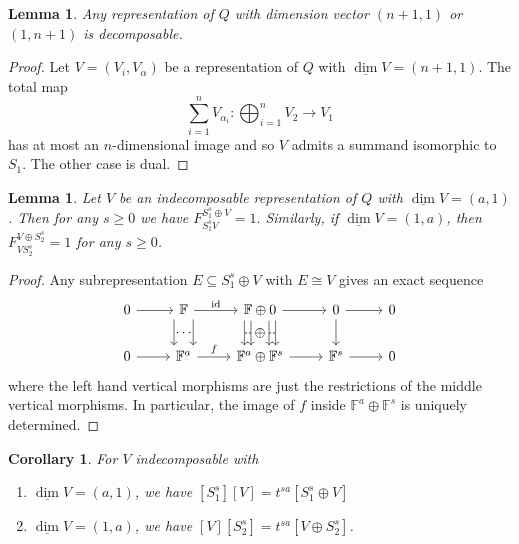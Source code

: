 \documentclass{book}
\newtheorem{lemma}[theorem]{Lemma}
\newtheorem{corollary}[theorem]{Corollary}
\newcommand{\id}{\mathrm{id}}
\begin{document}
    \begin{lemma}\label{(n+1,1)}
		    Any representation of $Q$ with dimension vector $(n+1,1)$ or $(1,n+1)$ is decomposable.
	\end{lemma}
	
	\begin{proof}
	    Let $V=(V_i,V_\alpha)$ be a representation of $Q$ with $\underline{\dim}V=(n+1,1)$. The total map \[\sum_{i=1}^nV_{\alpha_i}:\bigoplus_{i=1}^nV_2\to V_1\] has at most an $n$-dimensional image and so $V$ admits a summand isomorphic to $S_1$. The other case is dual.
	\end{proof}
    
    \begin{lemma}
        Let $V$ be an indecomposable representation of $Q$ with $\underline{\dim}V=(a,1)$. Then for any $s\geq 0$ we have $F_{S_1^s V}^{S_1^s\oplus V}=1.$ Similarly, if $\underline{\dim}V=(1,a)$, then  $F_{V S_2^s}^{V\oplus S_2^s}=1$ for any $s\geq 0$.
    \end{lemma}
    
    \begin{proof}
        Any subrepresentation $E\subseteq S_1^s\oplus V$ with $E\cong V$ gives an exact sequence 
        \[\begin{tikzcd}
            0\arrow{r} & \mathbb{F} \arrow[d,xshift=1.6ex]  \arrow[d, phantom, "{\hdots}"']     \arrow[d,xshift=-1.6ex]\arrow{r}{\id} & \mathbb{F}\oplus0 \arrow[d,xshift=-1.5ex] 
            \arrow[d, phantom, "{\oplus}"'] \arrow[d, phantom, "{..}"',xshift=-2ex]     \arrow[d,xshift=-2.6ex] \arrow[d,xshift=1.5ex]  \arrow[d, phantom, "{..}"',xshift=2ex]     \arrow[d,xshift=2.6ex] \arrow{r} & 0 \arrow{d}\arrow{r} & 0 \\
            0\arrow{r} & \mathbb{F}^a \arrow{r}{f} & \mathbb{F}^a\oplus \mathbb{F}^s \arrow{r} & \mathbb{F}^s \arrow{r} & 0
        \end{tikzcd}\]
        where the left hand vertical morphisms are just the restrictions of the middle vertical morphisms. In particular, the image of $f$ inside $\mathbb{F}^a\oplus \mathbb{F}^s$ is uniquely determined.
    \end{proof}
    
    \begin{corollary}
        For $V$ indecomposable with 
        \begin{enumerate}
            \item ${\underline \dim V} = (a,1)$, we have $\left[S_1^s \right][V]=t^{sa}\left[S_1^s\oplus V\right]$
            \item ${\underline \dim V} = (1,a)$, we have $[V]\left[S_2^s \right]=t^{sa}\left[V\oplus S_2^s\right]$.
        \end{enumerate}
    \end{corollary}
    
\end{document}
